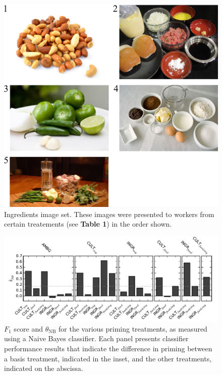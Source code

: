 \documentclass[a4paper]{report}
\begin{document}
\begin{figure}
	\includegraphics[scale=1.00]{figs/taskImages/ingredients.png}
	\caption{ Ingredients image set. These images were presented to workers 
		from certain treatements (see \textbf{Table 1}) in the order shown.}
\end{figure}

\begin{figure}
	\includegraphics{figs/f1-thetas_full_pairwise25_img1.pdf}
	\caption{ $F_1$ score and $\theta_\text{NB}$ for the various 
priming treatments, as measured using a Naive Bayes classifier. Each panel 
presents classifier performance results that indicate the difference in
priming between a basis 
treatment, indicated in the inset, and the other treatments, indicated on the
abscissa. }
\end{figure}

\end{document}
